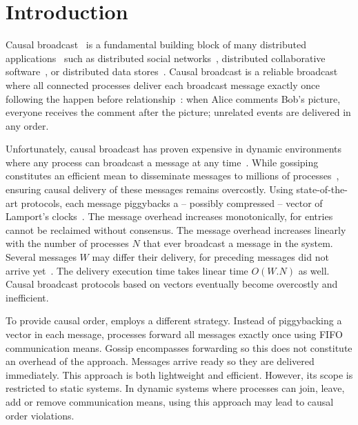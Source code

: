 
\section{Introduction}

Causal broadcast~\cite{hadzilacos1994modular} is a fundamental building block of
many distributed applications~\cite{nakamoto2009bitcoin} such as distributed
social networks~\cite{borthakur2013petabyte}, distributed collaborative
software~\cite{nedelec2016crate,heinrich2012exploiting}, or distributed data
stores~\cite{demers1987epidemic,shapiro2011comprehensive,bailis2013bolton,lloyd2011cops,bravo2017saturn}.
Causal broadcast is a reliable broadcast where all connected processes
deliver each broadcast message exactly once following the happen
before relationship~\cite{lamport1978time,schwarz1994detecting}: when
Alice comments Bob's picture, everyone receives the comment after the
picture; unrelated events are delivered in any order.

Unfortunately, causal broadcast has proven expensive in dynamic environments
where any process can broadcast a message at any
time~\cite{charronbost1991concerning}. While gossiping constitutes an efficient
mean to disseminate messages to millions of
processes~\cite{demers1987epidemic,birman1999bimodal}, ensuring causal
delivery of these messages remains overcostly.  Using state-of-the-art
protocols, each message piggybacks a -- possibly compressed -- vector of
Lamport's
clocks~\cite{almeida2008interval,fidge1988timestamps,mattern1989virtual,singhal1992efficient}.
The message overhead increases monotonically, for entries cannot be reclaimed
without consensus. The message overhead increases linearly with the number of
processes $N$ that ever broadcast a message in the system. Several messages $W$
may differ their delivery, for preceding messages did not arrive
yet~\cite{mehdi2017slowdown}.  The delivery execution time takes linear time
$O(W.N)$ as well.  Causal broadcast protocols based on vectors eventually become
overcostly and inefficient.


To provide causal order, \cite{friedman2004causal} employs a different
strategy. Instead of piggybacking a vector in each message, processes forward
all messages exactly once using FIFO communication means. Gossip encompasses
forwarding so this does not constitute an overhead of the approach.  Messages
arrive ready so they are delivered immediately. This approach is both
lightweight and efficient. However, its scope is restricted to static systems.
In dynamic systems where processes can join, leave, add or remove communication
means, using this approach may lead to causal order violations.


